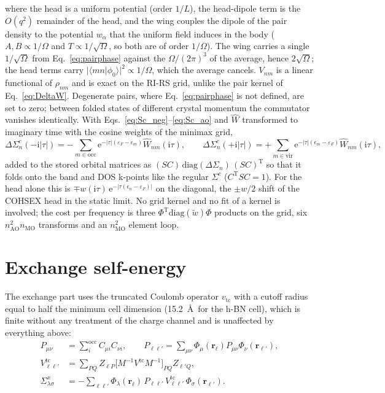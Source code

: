 \documentclass[11pt,a4paper]{article}
\newcommand{\br}{\mathbf{r}}
\newcommand{\ii}{\mathrm{i}}
\newcommand{\ee}{\mathrm{e}}
\newcommand{\Tr}{\mathrm{T}}
\newcommand{\occ}{\mathrm{occ}}
\newcommand{\vir}{\mathrm{vir}}
\newcommand{\tc}{\mathrm{tc}}
\begin{document}
where the head is a uniform potential (order $1/L$), the head-dipole term is the $O(q^2)$
remainder of the head, and the wing couples the dipole of the pair density to the potential
$w_\alpha$ that the uniform field induces in the body ($A, B\propto1/\Omega$ and
$T\propto1/\sqrt\Omega$, so both are of order $1/\Omega$). The wing carries a single
$1/\sqrt\Omega$ from Eq.~\eqref{eq:pairphase} against the $\Omega/(2\pi)^3$ of the average,
hence $2\sqrt\Omega$; the head terms carry $|\langle mn|\phi_0\rangle|^2\propto1/\Omega$, which
the average cancels. $V_{nm}$ is a linear functional of $\rho_{nm}$ and is exact on the RI-RS
grid, unlike the pair kernel of Eq.~\eqref{eq:DeltaW}. Degenerate pairs, where
Eq.~\eqref{eq:pairphase} is not defined, are set to zero; between folded states of different
crystal momentum the commutator vanishes identically. With Eqs.~\eqref{eq:Sc_neg}--\eqref{eq:Sc_ao}
and $\hat W$ transformed to imaginary time with the cosine weights of the minimax grid,
\begin{equation}
  \Delta\Sigma^c_n(-\ii|\tau|) = -\sum_{m\in\occ}\ee^{-|\tau|(\varepsilon_F-\epsilon_m)}\hat W_{nm}(\ii\tau),\qquad
  \Delta\Sigma^c_n(+\ii|\tau|) = +\sum_{m\in\vir}\ee^{-|\tau|(\epsilon_m-\varepsilon_F)}\hat W_{nm}(\ii\tau),
  \label{eq:dSigma3d}
\end{equation}
added to the stored orbital matrices as $(SC)\,\mathrm{diag}(\Delta\Sigma_n)\,(SC)^\Tr$ so that
it folds onto the band and DOS k-points like the regular $\Sigma^c$ ($C^\Tr S C = 1$). For the
head alone this is $\mp w(\ii\tau)\,\ee^{-|\tau(\epsilon_n-\varepsilon_F)|}$ on the diagonal, the
$\pm w/2$ shift of the COHSEX head in the static limit. No grid kernel and no fit of a kernel is
involved; the cost per frequency is three $\Phi^\Tr\mathrm{diag}(\tilde w)\Phi$ products on
the grid, six $n_\mathrm{AO}^2 n_\mathrm{MO}$ transforms and an $n_\mathrm{MO}^2$ element loop.

\section{Exchange self-energy}

The exchange part uses the truncated Coulomb operator $v_\tc$ with a cutoff radius equal to
half the minimum cell dimension (15.2~\AA\ for the h-BN cell), which is finite without any
treatment of the charge channel and is unaffected by everything above:
\begin{align}
  P_{\mu\nu} &= \sum_i^{\occ} C_{\mu i}C_{\nu i},\qquad
  P_{\ell\ell'} = \sum_{\mu\nu}\Phi_\mu(\br_\ell)P_{\mu\nu}\Phi_\nu(\br_{\ell'}),
  \label{eq:Sx_parts}\\
  V^\tc_{\ell\ell'} &= \sum_{PQ}Z_{\ell P}\big[M^{-1}V^\tc M^{-1}\big]_{PQ}Z_{\ell'Q},
  \label{eq:Vtc_grid}\\
  \Sigma^x_{\lambda\sigma} &= -\sum_{\ell\ell'}\Phi_\lambda(\br_\ell)\,P_{\ell\ell'}\,V^\tc_{\ell\ell'}\,\Phi_\sigma(\br_{\ell'}).
  \label{eq:Sx}
\end{align}
\end{document}
